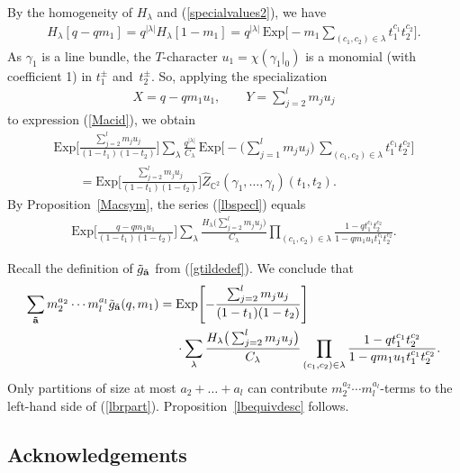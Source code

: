\documentclass[10pt,a4paper]{amsart}
\numberwithin{equation}{section}
\newcommand{\Exp}{\mathrm{Exp}}
\def\C{\mathbb C}
\begin{document}
By the homogeneity of $H_{\lambda}$ and (\ref{specialvalues2}), we have
\begin{gather*}
H_{\lambda}[q-qm_1]=q^{|\lambda|}H_{\lambda}[1-m_1]=q^{|\lambda|}\,
\Exp\biggl[-m_1\sum_{(c_1,c_2)\in\lambda}t_1^{c_1}t_2^{c_2}\biggr].
\end{gather*}
As $\gamma_1$ is a line bundle, the $T$-character $u_1=\chi(\gamma_1|_0)$ is a monomial (with coefficient 1) in $t_1^{\pm}$ and~$t_2^{\pm}$. So, applying the specialization
\begin{gather*}
X=q-qm_1u_1, \qquad Y=\sum_{j=2}^{l} m_ju_j
\end{gather*}
to expression (\ref{Macid}), we obtain
{\samepage\begin{gather}\nonumber
\Exp\Bigg[\frac{\sum_{j=2}^{l} m_ju_j}{(1-t_1)(1-t_2)}\Bigg]\sum_{\lambda} \frac{q^{|\lambda|}}{C_{\lambda}}\,\Exp\Biggl[-\bigg(\sum_{j=1}^{l} m_ju_j\bigg)\, \sum_{(c_1,c_2)\in \lambda} t_1^{c_1}t_2^{c_2} \Biggr]
\\ \qquad
{} = \Exp\Bigg[\frac{\sum_{j=2}^{l} m_ju_j}{(1-t_1)(1-t_2)}\Bigg]\hat{Z}_{\C^2}(\gamma_1,\dots,\gamma_l)(t_1,t_2) .\label{lbspecl}
\end{gather}}%
By Proposition~\ref{Macsym}, the series (\ref{lbspecl}) equals
\begin{align*}
\Exp\bigg[\frac{q-qm_1u_1}{(1-t_1)(1-t_2)}\bigg] \sum_{\lambda} \frac{H_{\lambda} \big(\sum_{j=2}^{l} m_ju_j\big)}{C_{\lambda}} \prod_{(c_1,c_2)\in \lambda} \frac{1-qt_1^{c_1}t_2^{c_2}}{1-qm_1u_1t_1^{c_1}t_2^{c_2}}.
\end{align*}

Recall the definition of $\tilde{g}_{\tilde{\bf{a}}}$ from (\ref{gtildedef}). We conclude that
\begin{align}\nonumber
\sum_{\bf{\tilde{a}}} m_2^{a_2}\cdots m_l^{a_l} \tilde{g}_{\tilde{\bf{a}}}(q,m_1)
={}&\Exp\Biggl[-\frac{\sum_{j=2}^{l} m_ju_j}{(1-t_1)(1-t_2)}\Biggr]
\\
&{}\cdot \sum_{\lambda} \frac{H_{\lambda} \big(\sum_{j=2}^{l} m_ju_j\big)}{C_{\lambda}} \prod_{(c_1,c_2)\in \lambda} \frac{1-qt_1^{c_1}t_2^{c_2}}{1-qm_1u_1t_1^{c_1}t_2^{c_2}}.
\label{lbrpart}
\end{align}
Only partitions of size at most $a_2+\dots+a_l$ can contribute $m_2^{a_2}\cdots m_l^{a_l}$-terms to the left-hand side of (\ref{lbrpart}). Proposition~\ref{lbequivdesc} follows.


\subsection*{Acknowledgements}
\end{document}
